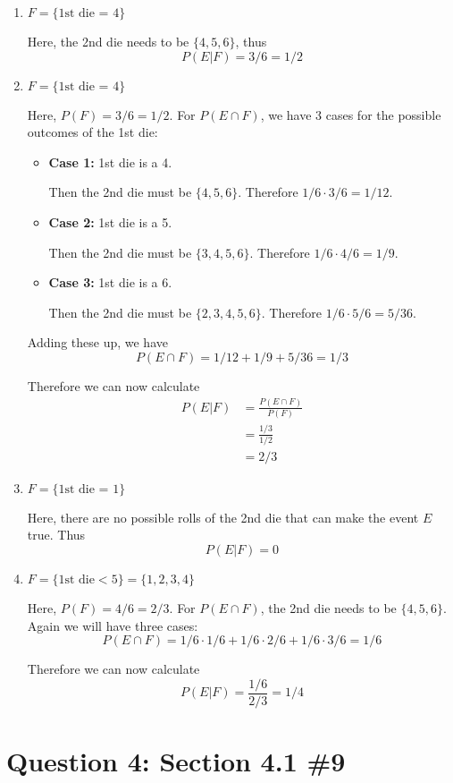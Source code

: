 \documentclass[11pt, oneside]{article}   	%
\begin{document}
\begin{enumerate}[\quad (a)]
	\item $F = \{\text{1st die = 4}\}$
	
	Here, the 2nd die needs to be $\{4,5,6\}$, thus
	$$P(E | F) = 3/6 = 1/2$$
	
	\item $F = \{\text{1st die = 4}\}$
	
	Here, $P(F) = 3/6 = 1/2$. For $P(E \cap F)$, we have 3 cases for the possible outcomes of the 1st die:
	\begin{itemize}
		\item \textbf{Case 1:} 1st die is a 4.
		
		Then the 2nd die must be $\{4,5,6\}$. Therefore $1/6 \cdot 3/6 = 1/12$.
		\item \textbf{Case 2:} 1st die is a 5.
	
		Then the 2nd die must be $\{3,4,5,6\}$. Therefore $1/6 \cdot 4/6 = 1/9$.
	
		\item \textbf{Case 3:} 1st die is a 6.
	
		Then the 2nd die must be $\{2,3,4,5,6\}$. Therefore $1/6 \cdot 5/6 = 5/36$.
	\end{itemize}
	
	Adding these up, we have
	$$P(E \cap F) = 1/12 + 1/9 + 5/36 = 1/3$$
	
	Therefore we can now calculate 
	\begin{align*}
		P(E | F) & = \frac{P(E \cap F)}{P(F)}\\
		& = \frac{1/3}{1/2} \\
		& = 2/3
	\end{align*}
	
	\item $F = \{\text{1st die = 1}\}$
	
	Here, there are no possible rolls of the 2nd die that can make the event $E$ true. Thus
	$$P(E | F) = 0$$
	
	\item $F = \{\text{1st die} < 5\} = \{1,2,3,4\}$
	
	Here, $P(F) = 4/6 = 2/3$. For $P(E \cap F)$, the 2nd die needs to be $\{4,5,6\}$. Again we will have three cases:
	$$P(E \cap F) = 1/6\cdot1/6 + 1/6\cdot 2/6 + 1/6 \cdot 3/6 = 1/6$$
	
	Therefore we can now calculate
	$$P(E | F) = \frac{1/6}{2/3} = 1/4$$
\end{enumerate}

\section*{Question 4: Section 4.1 \#9}
\end{document}
